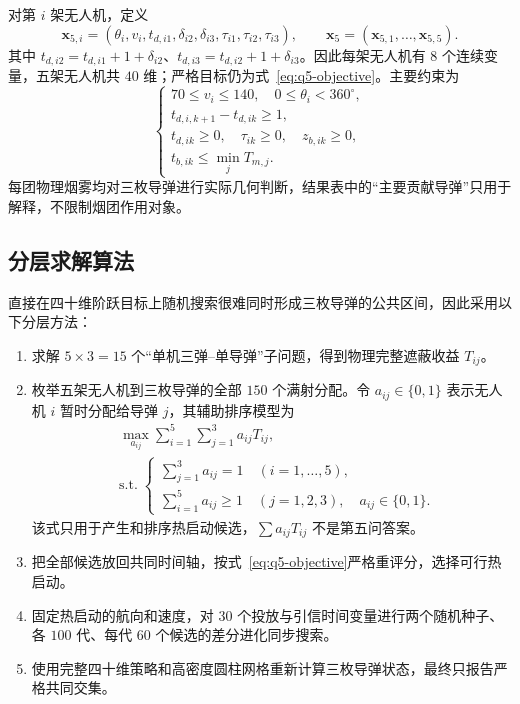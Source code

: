 \documentclass[12pt,a4paper]{article}
\begin{document}
对第 $i$ 架无人机，定义
\begin{equation}
\boldsymbol x_{5,i}=(\theta_i,v_i,t_{d,i1},\delta_{i2},\delta_{i3},\tau_{i1},\tau_{i2},\tau_{i3}),
\qquad \boldsymbol x_5=(\boldsymbol x_{5,1},\ldots,\boldsymbol x_{5,5}).
\label{eq:q5-variables}
\end{equation}
其中 $t_{d,i2}=t_{d,i1}+1+\delta_{i2}$、$t_{d,i3}=t_{d,i2}+1+\delta_{i3}$。因此每架无人机有 $8$ 个连续变量，五架无人机共 $40$ 维；严格目标仍为式~\eqref{eq:q5-objective}。主要约束为
\begin{equation}
\begin{cases}
70\le v_i\le140,\quad 0\le\theta_i<360^\circ,\\
t_{d,i,k+1}-t_{d,ik}\ge1,\\
t_{d,ik}\ge0,\quad \tau_{ik}\ge0,\quad z_{b,ik}\ge0,\\
t_{b,ik}\le \min_j T_{m,j}.
\end{cases}
\end{equation}
每团物理烟雾均对三枚导弹进行实际几何判断，结果表中的“主要贡献导弹”只用于解释，不限制烟团作用对象。

\subsection{分层求解算法}

直接在四十维阶跃目标上随机搜索很难同时形成三枚导弹的公共区间，因此采用以下分层方法：

\begin{enumerate}[label=\textbf{步骤\arabic*.}]
\item 求解 $5\times3=15$ 个“单机三弹--单导弹”子问题，得到物理完整遮蔽收益 $T_{ij}$。
\item 枚举五架无人机到三枚导弹的全部 $150$ 个满射分配。令 $a_{ij}\in\{0,1\}$ 表示无人机 $i$ 暂时分配给导弹 $j$，其辅助排序模型为
\begin{equation}
\begin{aligned}
&\max_{a_{ij}} \sum_{i=1}^{5}\sum_{j=1}^{3}a_{ij}T_{ij}, \\[6pt]
&\mathrm{s.t.}\; \left\{\begin{array}{l}
\sum_{j=1}^{3}a_{ij}=1\quad(i=1,\ldots,5), \\
\sum_{i=1}^{5}a_{ij}\ge1\quad(j=1,2,3),\quad a_{ij}\in\{0,1\}.
\end{array}\right.
\end{aligned}
\label{eq:q5-assignment-proxy}
\end{equation}
该式只用于产生和排序热启动候选，$\sum a_{ij}T_{ij}$ 不是第五问答案。
\item 把全部候选放回共同时间轴，按式~\eqref{eq:q5-objective}严格重评分，选择可行热启动。
\item 固定热启动的航向和速度，对 $30$ 个投放与引信时间变量进行两个随机种子、各 $100$ 代、每代 $60$ 个候选的差分进化同步搜索。
\item 使用完整四十维策略和高密度圆柱网格重新计算三枚导弹状态，最终只报告严格共同交集。
\end{enumerate}
\end{document}
